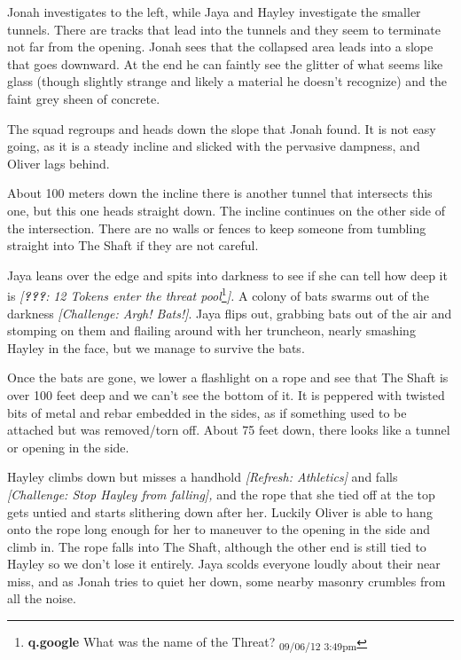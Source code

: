 Jonah investigates to the left, while Jaya and Hayley investigate the smaller tunnels. There are tracks that lead into the tunnels and they seem to terminate not far from the opening.  Jonah sees that the collapsed area leads into a slope that goes downward.  At the end he can faintly see the glitter of what seems like glass (though slightly strange and likely a material he doesn't recognize) and the faint grey sheen of concrete.



The squad regroups and heads down the slope that Jonah found.  It is not easy going, as it is a steady incline and slicked with the pervasive dampness, and Oliver lags behind.



About 100 meters down the incline there is another tunnel that intersects this one, but this one heads straight down.  The incline continues on the other side of the intersection.  There are no walls or fences to keep someone from tumbling straight into The Shaft if they are not careful.  



Jaya leans over the edge and spits into darkness to see if she can tell how deep it is \textit{{[}}\textit{\textbf{???}}\textit{: }\textit{12 Tokens enter the threat pool}\footnote{\textbf{q.google }What was the name of the Threat? \textsubscript{09/06/12 3:49pm}}\textit{{]}.}   A colony of bats swarms out of the darkness \textit{{[}Challenge: Argh!  Bats!{]}}.  Jaya flips out, grabbing bats out of the air and stomping on them and flailing around with her truncheon, nearly smashing Hayley in the face, but we manage to survive the bats.  



Once the bats are gone, we lower a flashlight on a rope and see that The Shaft is over 100 feet deep and we can't see the bottom of it.  It is peppered with twisted bits of metal and rebar embedded in the sides, as if something used to be attached but was removed/torn off.  About 75 feet down, there looks like a tunnel or opening in the side.



Hayley climbs down but misses a handhold \textit{{[}Refresh: Athletics{]}} and falls \textit{{[}Challenge: Stop Hayley from falling{]},} and the rope that she tied off at the top gets untied and starts slithering down after her.  Luckily Oliver is able to hang onto the rope long enough for her to maneuver to the opening in the side and climb in.  The rope falls into The Shaft, although the other end is still tied to Hayley so we don't lose it entirely.  Jaya scolds everyone loudly about their near miss, and as Jonah tries to quiet her down, some nearby masonry crumbles from all the noise.



